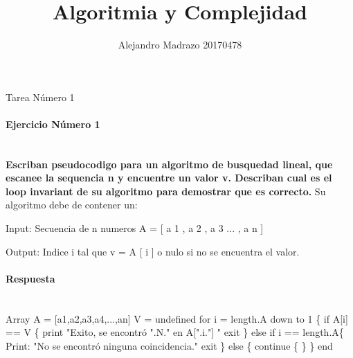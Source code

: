 \documentclass{article}
\title{Algoritmia y Complejidad}
\author{Alejandro Madrazo 20170478}
\date{}
\begin{document}
\maketitle
Tarea Número 1 



\paragraph{Ejercicio Número 1} ~\\ \newline
\textbf{Escriban pseudocodigo para un algoritmo de busquedad lineal, que escanee la sequencia n y encuentre un valor v. Describan cual es el loop invariant de su algoritmo para demostrar que es correcto.}\newline
Su algoritmo debe de contener un:

Input: Secuencia de n numeros A = [ a 1 , a 2 , a 3 ... , a n ]

Output: Indice i tal que v = A [ i ] o nulo si no se encuentra el valor. \newline

\paragraph{Respuesta} ~\\ \newline
Array A = [a1,a2,a3,a4,...,an] \newline V =  undefined \newline for i = length.A down to 1  \{ \newline
		\indent \indent \indent if A[i] == V \{ \newline
			\indent \indent \indent \indent print "Exito, se encontró ".N." en A[".i."] " \newline
			\indent \indent \indent \indent exit \newline
		\indent \indent \} else  if i == length.A\{ \newline
			\indent \indent \indent Print: "No se encontró ninguna coincidencia." \newline
			\indent \indent \indent exit \newline
		\indent \indent \} \newline
		\indent \indent else \{ \newline
		\indent  \indent  \indent continue \{ \newline
		\indent \indent \} \newline
	\indent \} \newline 
\indent end
\end{document}
